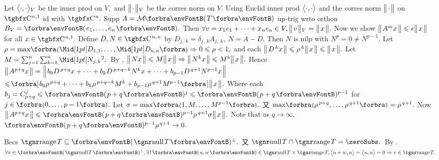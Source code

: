 Let $\big\langle{}\cdot,\cdot{}\big\rangle{_V}$ be the inner prod on $V,$ and $\big\Vert\hspace{1pt}{}{\cdot}{}\hspace{1pt}\big\Vert{_V}$ be the corres norm on $V.$\parSol{}
Using Euclid inner prod $\big\langle{}\cdot,\cdot{}\big\rangle$ and the corres norm $\big\Vert\hspace{1pt}{}{\cdot}{}\hspace{1pt}\big\Vert$ on $\CbbP{n,1}$ id with $\CbbP{n}.$\parSol{}
Supp $A=\Mt{T}$ up-trig wrto orthon $B_V=\Par{e_1,\dots,e_n}.$\parSol{}
Then $\forall v=x_1e_1+\dots+x_ne_n\in V,\big\Vert\hspace{1pt}{}v{}\hspace{1pt}\big\Vert{_V}=\big\Vert\hspace{1pt}{}x{}\hspace{1pt}\big\Vert.$ Now we show $\big\Vert\hspace{1pt}{}A^mx{}\hspace{1pt}\big\Vert\leqslant\epsilon\big\Vert\hspace{1pt}{}x{}\hspace{1pt}\big\Vert$ for all $x\in\CbbP{n,1}.$\parSol{}
Define $D,N\in\CbbP{n,\;\!n}$ by $D_{j,\;\!k}=\delta_{j,\:\!k}A_{j,\;\!k},\:N=A-D.$ Then $N$ is nilp with $N^p=0\neq N^{p-1}.$\parSol{}
Let $\rho=\max\!\Bra{\aMid{D_{1,1}},\dots,\aMid{D_{n,n}}}\Rightarrow0\leqslant\rho<1,$ and each $\big\Vert\hspace{1pt}{}D^{\,k}x{}\hspace{1pt}\big\Vert\leqslant\rho^{\,k}\big\Vert\hspace{1pt}{}x{}\hspace{1pt}\big\Vert\leqslant\big\Vert\hspace{1pt}{}x{}\hspace{1pt}\big\Vert.$\vspace{3pt}\parSol{}
Let $M=\sum_{j=1}^n\sum_{k=1}^n\aMidsq{N_{j,\;\!k}}.$ \,{By }, $\big\Vert\hspace{1pt}{}Nx{}\hspace{1pt}\big\Vert\leqslant M\big\Vert\hspace{1pt}{}x{}\hspace{1pt}\big\Vert\Rightarrow\big\Vert\hspace{1pt}{}N^{k}x{}\hspace{1pt}\big\Vert\leqslant M^k\big\Vert\hspace{1pt}{}x{}\hspace{1pt}\big\Vert.$\vspace{5pt}\parSol{}
Hence $\big\Vert\hspace{1pt}{}A^{p+q}x{}\hspace{1pt}\big\Vert=\Big\Vert\hspace{1pt}{}b_0D^{\,p+q}x+\dots+b_kD^{\,p+q-k}N^{k}x+\dots+b_{p-1}D^{\,q+1}N^{p-1}x{}\hspace{1pt}\Big\Vert$\vspace{3pt}\parSol{}
$\leqslant\!\BigSbra{{b_0\rho^{\,p+q}+\dots+b_k\rho^{\,p+q-k}M^k+b_{p-1}\rho^{\,q+1}M^{p-1}}}\Dvert{x}.$\vspace{4pt}\parSol{}
Where each $b_j=\mathC_{p+q}^j\leqslant\Par{p+q}{^j}\leqslant\Par{p+q}{^{p-1}}$ for $j\in\;\!\!\Bra{0,\dots,p-1}.$\vspace{1pt}\parSol{}
Let $\sigma=\max\!\Bra{1,M,\dots,M^{p-1}}.$ 又 $\max\!\Bra{\rho^{\,p+q},\dots,\rho^{\,q+1}}=\rho^{\,q+1}.$\parSol{}
Now $\Dvert{A^{p+q}x}\leqslant\Par{p+q}{^{p-1}}\rho^{\,q+1}\sigma\Dvert{x}.$ \;Note that as $q\rightarrow\infty,$ \,$\Par{p+q}{^{p-1}}\rho^{\,q+1}\rightarrow0.$\PfEnd
\SepLine
\ChEnd


\vspace{4pt}

Becs $\range T\subseteq\Par{\null T}{^\perp}.$ 又 $\null T\cap\range T=\zeroSubs.$ \,By .\PfEnd\parSol{}
\Or $\forall v\in\Par{\null T}{^\perp},\exists\,!\,\Par{u,w}\in\null T\times\range T,\Ang{u+w,u}=\Ang{u,u}=0\Rightarrow v\in\range T.$\PfEnd
\SepLine

